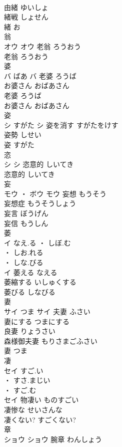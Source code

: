 \documentclass[8pt]{extreport}
\begin{document}
\begin{CJK}{UTF8}{min}
\\	由緒	ゆいしょ	
\\	緒戦	しょせん	
\\	緒	お	
\\	翁	
\\	オウ		オウ	老翁	ろうおう	
\\	老翁	ろうおう	
\\	婆	
\\	バ	ばあ	バ	老婆	ろうば	
\\	お婆さん	おばあさん	
\\	老婆	ろうば	
\\	お婆さん	おばあさん	
\\	姿	
\\	シ	すがた	シ	姿を消す	すがたをけす	
\\	姿勢	しせい	
\\	姿	すがた	
\\	恣	
\\	シ		シ	恣意的	しいてき	
\\	恣意的	しいてき	
\\	妄	
\\	モウ ・ ボウ		モウ	妄想	もうそう	
\\	妄想症	もうそうしょう	
\\	妄言	ぼうげん	
\\	妄信	もうしん	
\\	萎	
\\	イ	なえ.る ・ しぼ.む
\\	・ しお.れる
\\	・ しな.びる
\\	イ	萎える	なえる	
\\	萎縮する	いしゅくする	
\\	萎びる	しなびる	
\\	妻	
\\	サイ	つま	サイ	夫妻	ふさい	
\\	妻にする	つまにする	
\\	良妻	りょうさい	
\\	森様御夫妻	もりさまごふさい	
\\	妻	つま	
\\	凄	
\\	セイ	すご.い
\\	・ すさ.まじい
\\	・ すご.む
\\	セイ	物凄い	ものすごい	
\\	凄惨な	せいさんな	
\\	凄くない?	すごくない?	
\\	章	
\\	ショウ		ショウ	腕章	わんしょう	

\end{CJK}
\end{document}
